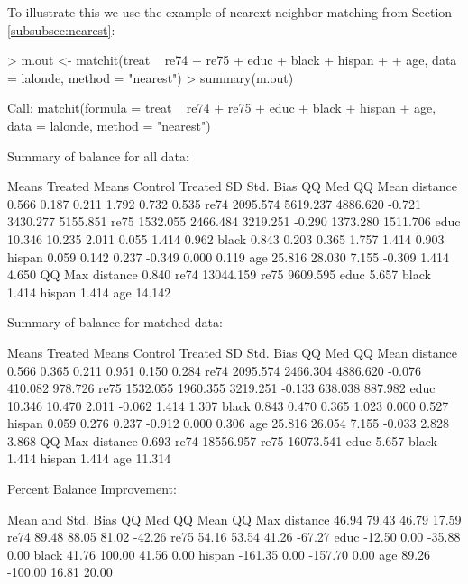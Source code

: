 \documentclass[oneside,letterpaper,titlepage]{article}
\begin{document}
\begin{enumerate}
  To illustrate this we use the example of nearext neighbor matching from Section \ref{subsubsec:nearest}:
\begin{Schunk}
\begin{Sinput}
> m.out <- matchit(treat ~ re74 + re75 + educ + black + hispan + 
+     age, data = lalonde, method = "nearest")
> summary(m.out)
\end{Sinput}
\begin{Soutput}
Call:
matchit(formula = treat ~ re74 + re75 + educ + black + hispan +     age, data = lalonde, method = "nearest")

Summary of balance for all data:

         Means Treated Means Control Treated SD Std. Bias   QQ Med  QQ Mean
distance         0.566         0.187      0.211     1.792    0.732    0.535
re74          2095.574      5619.237   4886.620    -0.721 3430.277 5155.851
re75          1532.055      2466.484   3219.251    -0.290 1373.280 1511.706
educ            10.346        10.235      2.011     0.055    1.414    0.962
black            0.843         0.203      0.365     1.757    1.414    0.903
hispan           0.059         0.142      0.237    -0.349    0.000    0.119
age             25.816        28.030      7.155    -0.309    1.414    4.650
            QQ Max
distance     0.840
re74     13044.159
re75      9609.595
educ         5.657
black        1.414
hispan       1.414
age         14.142

Summary of balance for matched data:

         Means Treated Means Control Treated SD Std. Bias  QQ Med QQ Mean
distance         0.566         0.365      0.211     0.951   0.150   0.284
re74          2095.574      2466.304   4886.620    -0.076 410.082 978.726
re75          1532.055      1960.355   3219.251    -0.133 638.038 887.982
educ            10.346        10.470      2.011    -0.062   1.414   1.307
black            0.843         0.470      0.365     1.023   0.000   0.527
hispan           0.059         0.276      0.237    -0.912   0.000   0.306
age             25.816        26.054      7.155    -0.033   2.828   3.868
            QQ Max
distance     0.693
re74     18556.957
re75     16073.541
educ         5.657
black        1.414
hispan       1.414
age         11.314

Percent Balance Improvement:

         Mean and Std. Bias  QQ Med QQ Mean QQ Max
distance              46.94   79.43   46.79  17.59
re74                  89.48   88.05   81.02 -42.26
re75                  54.16   53.54   41.26 -67.27
educ                 -12.50    0.00  -35.88   0.00
black                 41.76  100.00   41.56   0.00
hispan              -161.35    0.00 -157.70   0.00
age                   89.26 -100.00   16.81  20.00


\end{Soutput}
\end{Schunk}
\end{enumerate}
\end{document}
